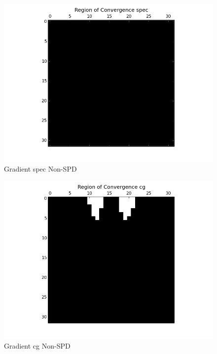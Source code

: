 \documentclass{article}
\begin{document}
\begin{figure}[H]
  \centering
  \includegraphics[scale=0.5]{specregion.png}
  \caption{Gradient spec Non-SPD}
\end{figure}
\begin{figure}[H]
  \centering
  \includegraphics[scale=0.5]{cgregion.png}
  \caption{Gradient cg Non-SPD}
\end{figure}
\end{document}
